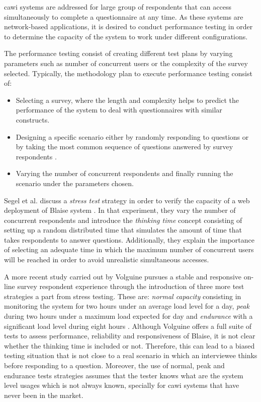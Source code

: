 	\gls{cawi} systems are addressed for large group of respondents that can access simultaneously to complete a questionnaire at any time. As these systems are network-based applications, it is desired to conduct performance testing in order to determine the capacity of the system to work under different configurations.

	The performance testing consist of creating different test plans by varying parameters such as number of concurrent users or the complexity of the survey selected. Typically, the methodology plan to execute performance testing consist of:

	\begin{itemize}
		\item Selecting a survey, where the length and complexity helps to predict the performance of the system to deal with questionnaires with similar constructs.
		\item Designing a specific scenario either by randomly responding to questions or by taking the most common sequence of questions answered by survey respondents \cite{proc:volguine13}.
		\item Varying the number of concurrent respondents and finally running the scenario under the parameters chosen.
	\end{itemize}

	Segel et al. discuss a \emph{stress test} strategy in order to verify the capacity of a web deployment of Blaise system \cite{proc:segel13}. In that experiment, they vary the number of concurrent respondents and introduce the \emph{thinking time} concept consisting of setting up a random distributed time that simulates the amount of time that takes respondents to answer questions. Additionally, they explain the importance of selecting an adequate time in which the maximum number of concurrent users will be reached in order to avoid unrealistic simultaneous accesses.

	A more recent study carried out by Volguine pursues a stable and responsive on-line survey respondent experience through the introduction of three more test strategies a part from stress testing. These are: \emph{normal capacity} consisting in monitoring the system for two hours under an average load level for a day, \emph{peak} during two hours under a maximum load expected for day and \emph{endurance} with a significant load level during eight hours \cite{proc:volguine13}. Although Volguine offers a full suite of tests to assess performance, reliability and responsiveness of Blaise, it is not clear whether the thinking time is included or not. Therefore, this can lead to a biased testing situation that is not close to a real scenario in which an interviewee thinks before responding to a question. Moreover, the use of normal, peak and endurance tests strategies assumes that the tester knows what are the system level usages which is not always known, specially for \gls{cawi} systems that have never been in the market.